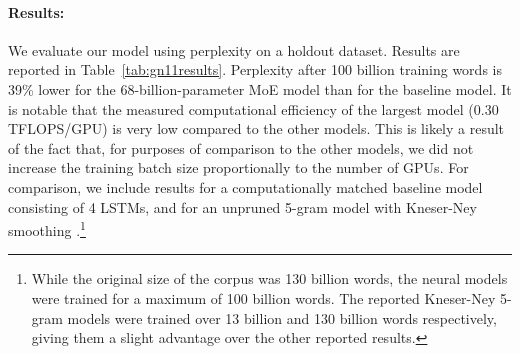 \documentclass{article}
\begin{document}
\begin{table}[h!]
\caption{ Model comparison on 100 Billion Word Google News Dataset}
\label{tab:gn11results}
\begin{center}
\setlength\tabcolsep{3pt}
\end{center}
\end{table}

\paragraph{Results:} We evaluate our model using perplexity on a holdout dataset.   Results are reported in Table~\ref{tab:gn11results}.  Perplexity after 100 billion training words is 39\% lower for the 68-billion-parameter MoE model than for the baseline model.   It is notable that the measured computational efficiency of the largest model (0.30 TFLOPS/GPU) is very low compared to the other models.  This is likely a result of the fact that, for purposes of comparison to the other models, we did not increase the training batch size proportionally to the number of GPUs.  For comparison, we include results for a computationally matched baseline model consisting of 4 LSTMs, and for an unpruned 5-gram model with Kneser-Ney smoothing \citep{KneserNey95}.\footnote{While the original size of the corpus was 130 billion words, the neural models were trained for a maximum of 100 billion words.  The reported Kneser-Ney 5-gram models were trained over 13 billion and 130 billion words respectively, giving them a slight advantage over the other reported results.}
\end{document}
